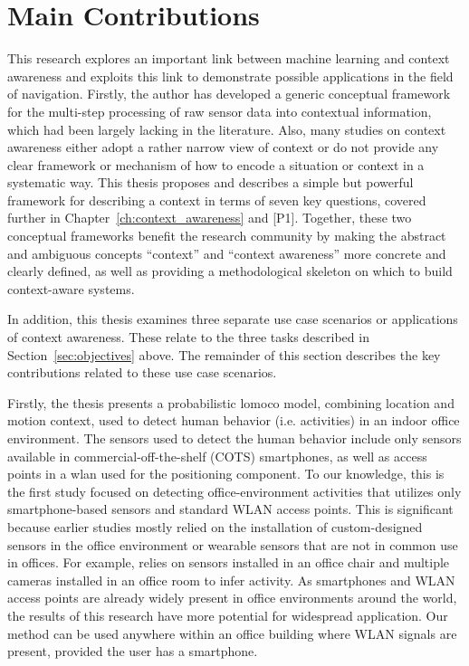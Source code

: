 \section{Main Contributions}
\label{sec:contributions}

This research explores an important link between machine learning and context awareness and exploits this link to demonstrate possible applications in the field of navigation. Firstly, the author has developed a generic conceptual framework for the multi-step processing of raw sensor data into contextual information, which had been largely lacking in the literature.  Also, many studies on context awareness either adopt a rather narrow view of context or do not provide any clear framework or mechanism of how to encode a situation or context in a systematic way. This thesis proposes and describes a simple but powerful framework for describing a context in terms of seven key questions, covered further in Chapter~\ref{ch:context_awareness} and [P1]. Together, these two conceptual frameworks benefit the research community by making the abstract and ambiguous concepts ``context'' and ``context awareness'' more concrete and clearly defined, as well as providing a methodological skeleton on which to build context-aware systems.

In addition, this thesis examines three separate use case scenarios or applications of context awareness. These relate to the three tasks described in Section~\ref{sec:objectives} above. The remainder of this section describes the key contributions related to these use case scenarios.

Firstly, the thesis presents a probabilistic \gls{lomoco} model, combining location and motion context, used to detect human behavior (i.e. activities) in an indoor office environment. The sensors used to detect the human behavior include only sensors available in commercial-off-the-shelf (COTS) smartphones, as well as access points in a \gls{wlan} used for the positioning component. To our knowledge, this is the first study focused on detecting office-environment activities that utilizes only smartphone-based sensors and standard WLAN access points. This is significant because earlier studies mostly relied on the installation of custom-designed sensors in the office environment or wearable sensors that are not in common use in offices. For example, \cite{Manabe2010} relies on sensors installed in an office chair and multiple cameras installed in an office room to infer activity. As smartphones and WLAN access points are already widely present in office environments around the world, the results of this research have more potential for widespread application. Our method can be used anywhere within an office building where WLAN signals are present, provided the user has a smartphone.

